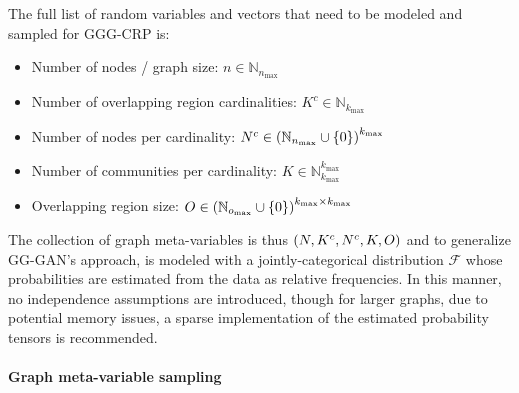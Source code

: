 The full list of random variables and vectors that need to be modeled and sampled for GGG-CRP is:

\begin{itemize}
\item Number of nodes / graph size: $n \in \mathbb{N}_{n_{\max}}$
\item Number of overlapping region cardinalities: $K^c \in \mathbb{N}_{k_{\max}}$
\item Number of nodes per cardinality: $N^c \in \mathopen{}\left(\mathbb{N}_{n_{\max}} \cup \mathopen{}\left\{0\right\}\right)^{k_{\max}}$
\item Number of communities per cardinality: $K \in \mathbb{N}_{k_{\max}}^{k_{\max}}$
\item Overlapping region size: $O \in \mathopen{}\left(\mathbb{N}_{o_{\max}} \cup \mathopen{}\left\{0\right\}\right)^{k_{\max} \times k_{\max}}$
\end{itemize}

The collection of graph meta-variables is thus $\mathopen{}\left(N, K^c, N^c, K, O\right)$ and to generalize GG-GAN's approach, is modeled with a jointly-categorical distribution $\mathcal{F}$ whose probabilities are estimated from the data as relative frequencies. In this manner, no independence assumptions are introduced, though for larger graphs, due to potential memory issues, a sparse implementation of the estimated probability tensors is recommended.

\paragraph{Graph meta-variable sampling}

